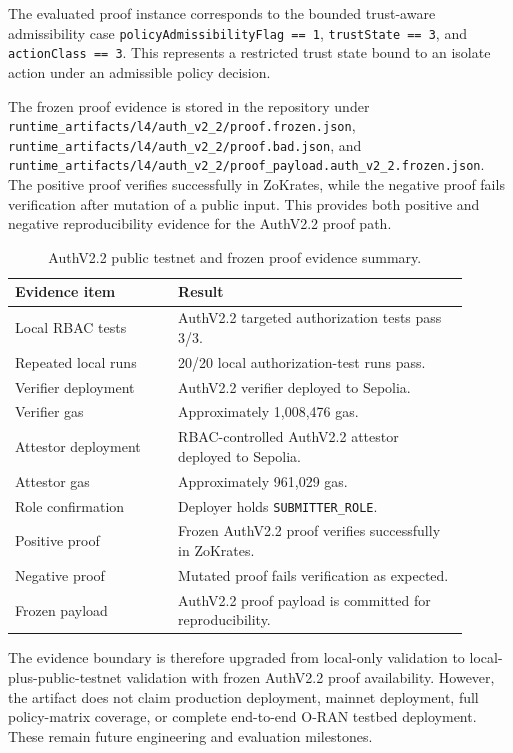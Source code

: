 The evaluated proof instance corresponds to the bounded trust-aware admissibility case \texttt{policyAdmissibilityFlag == 1}, \texttt{trustState == 3}, and \texttt{actionClass == 3}. This represents a restricted trust state bound to an isolate action under an admissible policy decision.

The frozen proof evidence is stored in the repository under \texttt{runtime\_artifacts/l4/auth\_v2\_2/proof.frozen.json}, \texttt{runtime\_artifacts/l4/auth\_v2\_2/proof.bad.json}, and \texttt{runtime\_artifacts/l4/auth\_v2\_2/proof\_payload.auth\_v2\_2.frozen.json}. The positive proof verifies successfully in ZoKrates, while the negative proof fails verification after mutation of a public input. This provides both positive and negative reproducibility evidence for the AuthV2.2 proof path.

\begin{table}[t]
\centering
\caption{AuthV2.2 public testnet and frozen proof evidence summary.}
\label{tab:authv22-evidence-summary}
\begin{tabular}{p{0.32\linewidth} p{0.58\linewidth}}
\hline
\textbf{Evidence item} & \textbf{Result} \\
\hline
Local RBAC tests & AuthV2.2 targeted authorization tests pass 3/3. \\
Repeated local runs & 20/20 local authorization-test runs pass. \\
Verifier deployment & AuthV2.2 verifier deployed to Sepolia. \\
Verifier gas & Approximately 1,008,476 gas. \\
Attestor deployment & RBAC-controlled AuthV2.2 attestor deployed to Sepolia. \\
Attestor gas & Approximately 961,029 gas. \\
Role confirmation & Deployer holds \texttt{SUBMITTER\_ROLE}. \\
Positive proof & Frozen AuthV2.2 proof verifies successfully in ZoKrates. \\
Negative proof & Mutated proof fails verification as expected. \\
Frozen payload & AuthV2.2 proof payload is committed for reproducibility. \\
\hline
\end{tabular}
\end{table}

The evidence boundary is therefore upgraded from local-only validation to local-plus-public-testnet validation with frozen AuthV2.2 proof availability. However, the artifact does not claim production deployment, mainnet deployment, full policy-matrix coverage, or complete end-to-end O-RAN testbed deployment. These remain future engineering and evaluation milestones.
